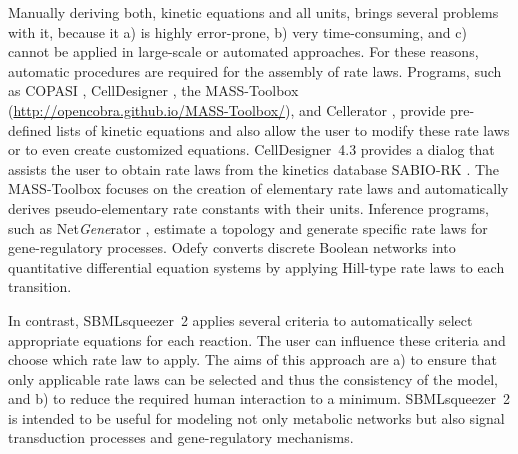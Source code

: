 \documentclass{bioinfo}
\begin{document}
Manually deriving both, kinetic equations and all units, brings several problems with it, because it
a) is highly error-prone, %
b) very time-consuming, and
c) cannot be applied in large-scale or automated approaches.
For these reasons, %
automatic procedures are required for the assembly of rate laws.
Programs, such as
COPASI \citep{Hoops2006}, 
CellDesigner \citep{Funahashi2007}, %
the MASS-Toolbox (\url{http://opencobra.github.io/MASS-Toolbox/}), and 
Cellerator \citep{Shapiro2002}, 
provide pre-defined lists of kinetic equations and also allow the user to modify these rate laws or to even create customized equations.
CellDesigner~4.3 %
provides a dialog that assists the user to obtain rate laws from the kinetics database SABIO-RK \citep{Wittig2012}.
The MASS-Toolbox focuses on the creation of elementary rate laws and automatically derives pseudo-elementary rate constants with their units.
Inference programs, such as Net\emph{Gene}rator \citep{Weber2013}, estimate a topology and generate specific rate laws  for gene-regulatory processes. 
Odefy \citep{Krumsiek2010} converts discrete Boolean networks into quantitative differential equation systems by applying Hill-type rate laws to each transition. %

In contrast, SBMLsqueezer~2 applies several criteria to automatically select appropriate equations for each reaction.
The user can influence these criteria %
and choose which rate law to apply.
The aims of this approach are
a) to ensure that only applicable rate laws can be selected and thus the consistency of the model, and
b) to reduce the required human interaction to a minimum.
SBMLsqueezer~2 is intended to be useful for modeling not only metabolic networks but also signal transduction processes and gene-regulatory mechanisms.
\end{document}
